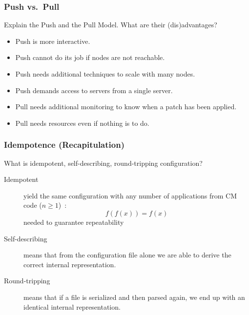 \begin{frame}
	\frametitle{Push vs.\ Pull}

	\begin{task}
	Explain the Push and the Pull Model.
	What are their (dis)advantages?
	\end{task}

	\pause

	\begin{itemize} %
	\item Push is more interactive.
	\item Push cannot do its job if nodes are not reachable.
	\item Push needs additional techniques to scale with many nodes.
	\item Push demands access to servers from a single server.
	\item Pull needs additional monitoring to know when a patch has been applied.
	\item Pull needs resources even if nothing is to do.
	\end{itemize}
\end{frame}


\begin{frame}
	\frametitle{Idempotence (Recapitulation)}

	\begin{task}
	What is idempotent, self-describing, round-tripping configuration?
	\end{task}

	\pause


	\begin{description}
	\item[Idempotent]
	yield the same configuration with any number of applications from CM code ($n\ge1$)~\cite{waldemar2013testing}:
	\[
		f(f(x))=f(x)
	\]
	needed to guarantee repeatability

	\item[Self-describing]
	means that from the configuration file alone we are able to derive the correct internal representation.~\cite{wadler2003xml}

	\item[Round-tripping]
	means that if a file is serialized and then parsed again, we end up with an identical internal representation.~\cite{wadler2003xml}

	\end{description}
\end{frame}

